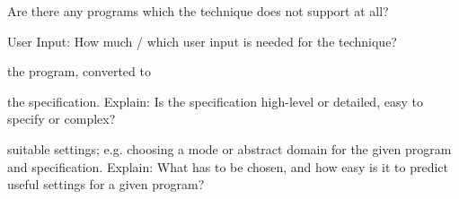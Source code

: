 \documentclass[a4paper]{article}
\begin{document}
\begin{minipage}[t]{0.16\linewidth}
\begin{betterlist}
\begin{betterlist}
\begin{betterlist}
			\end{betterlist}
			\item Are there any programs which the technique does not support at all?

		\end{betterlist}
		\item \alert{User Input:} How much / which user input is needed for the technique?
		\begin{betterlist}
			\item \checkboxChecked the program, converted to

			\item \checkboxHalfChecked the specification. Explain: Is the specification high-level or detailed, easy to specify or complex?

			\item \checkboxChecked suitable settings; e.g. choosing a mode or abstract domain for the given program and specification. Explain: What has to be chosen, and how easy is it to predict useful settings for a given program?


\end{betterlist}
\end{betterlist}
\end{minipage}
\end{document}
